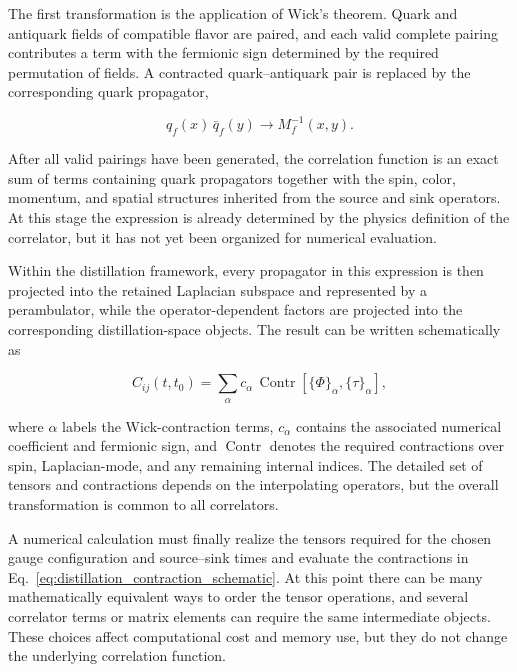 \documentclass[11pt]{article}
\begin{document}
The first transformation is the application of Wick's theorem. Quark and
antiquark fields of compatible flavor are paired, and each valid complete
pairing contributes a term with the fermionic sign determined by the required
permutation of fields. A contracted quark--antiquark pair is replaced by the
corresponding quark propagator,

\begin{equation}
q_f(x)\,\bar q_f(y)
\longrightarrow
M_f^{-1}(x,y).
\label{eq:wick_to_propagator}
\end{equation}

After all valid pairings have been generated, the correlation function is an
exact sum of terms containing quark propagators together with the spin, color,
momentum, and spatial structures inherited from the source and sink operators.
At this stage the expression is already determined by the physics definition
of the correlator, but it has not yet been organized for numerical evaluation.

Within the distillation framework, every propagator in this expression is then
projected into the retained Laplacian subspace and represented by a
perambulator, while the operator-dependent factors are projected into the
corresponding distillation-space objects. The result can be written
schematically as

\begin{equation}
C_{ij}(t,t_0)
=
\sum_{\alpha}
 c_{\alpha}\,
\operatorname{Contr}
\left[
\{\Phi\}_{\alpha},
\{\tau\}_{\alpha}
\right],
\label{eq:distillation_contraction_schematic}
\end{equation}

where \(\alpha\) labels the Wick-contraction terms, \(c_{\alpha}\) contains the
associated numerical coefficient and fermionic sign, and
\(\operatorname{Contr}\) denotes the required contractions over spin,
Laplacian-mode, and any remaining internal indices. The detailed set of tensors
and contractions depends on the interpolating operators, but the overall
transformation is common to all correlators.

A numerical calculation must finally realize the tensors required for the
chosen gauge configuration and source--sink times and evaluate the contractions
in Eq.~\eqref{eq:distillation_contraction_schematic}. At this point there can be
many mathematically equivalent ways to order the tensor operations, and several
correlator terms or matrix elements can require the same intermediate objects.
These choices affect computational cost and memory use, but they do not change
the underlying correlation function.
\end{document}
